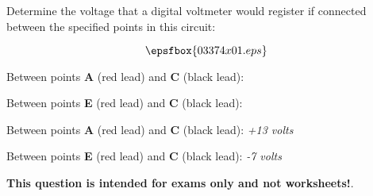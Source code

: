 

Determine the voltage that a digital voltmeter would register if connected between the specified points in this circuit:

$$\epsfbox{03374x01.eps}$$

Between points {\bf A} (red lead) and {\bf C} (black lead):

\vskip 10pt

Between points {\bf E} (red lead) and {\bf C} (black lead):







Between points {\bf A} (red lead) and {\bf C} (black lead): {\it +13 volts}

\vskip 10pt

Between points {\bf E} (red lead) and {\bf C} (black lead): {\it -7 volts}







{\bf This question is intended for exams only and not worksheets!}.



